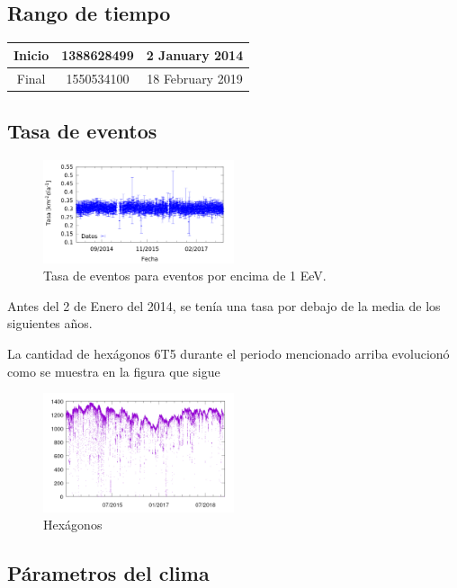 

\subsection{Rango de tiempo}
\begin{table}[H]
\centering
\begin{tabular}{c|c|c}
Inicio & 1388628499 & 2 January 2014 \\ \hline
Final  & 1550534100 & 18 February 2019 \\
\end{tabular}
\end{table}

\subsection{Tasa de eventos}

\begin{figure}[H]
	\centering
	\includegraphics[width=0.5\textwidth]{rate_1_EeV.png}
	\caption{Tasa de eventos para eventos por encima de 1 EeV.}
\end{figure}

Antes del 2 de Enero del 2014, se tenía una tasa por debajo de la media de los siguientes años.

La cantidad de hexágonos 6T5 durante el periodo mencionado arriba evolucionó como se muestra  en la figura que sigue


\begin{figure}[H]
	\centering
	\includegraphics[width=0.5\textwidth]{hex_rango_corto.png}
	\caption{Hexágonos}
\end{figure}


\subsection{Párametros del clima}

